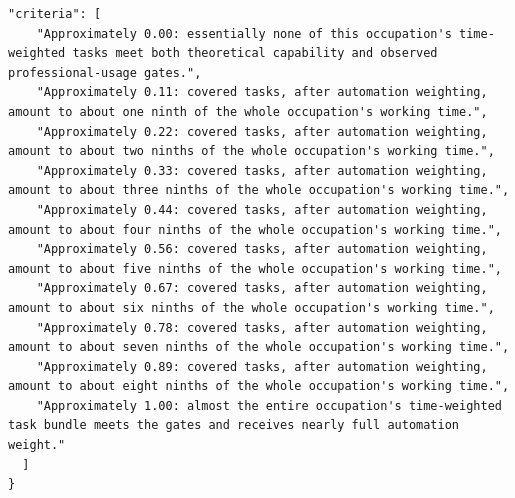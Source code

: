{\begin{Verbatim}[breaklines=true,breakanywhere=true,fontsize=\footnotesize]
  "criteria": [
    "Approximately 0.00: essentially none of this occupation's time-weighted tasks meet both theoretical capability and observed professional-usage gates.",
    "Approximately 0.11: covered tasks, after automation weighting, amount to about one ninth of the whole occupation's working time.",
    "Approximately 0.22: covered tasks, after automation weighting, amount to about two ninths of the whole occupation's working time.",
    "Approximately 0.33: covered tasks, after automation weighting, amount to about three ninths of the whole occupation's working time.",
    "Approximately 0.44: covered tasks, after automation weighting, amount to about four ninths of the whole occupation's working time.",
    "Approximately 0.56: covered tasks, after automation weighting, amount to about five ninths of the whole occupation's working time.",
    "Approximately 0.67: covered tasks, after automation weighting, amount to about six ninths of the whole occupation's working time.",
    "Approximately 0.78: covered tasks, after automation weighting, amount to about seven ninths of the whole occupation's working time.",
    "Approximately 0.89: covered tasks, after automation weighting, amount to about eight ninths of the whole occupation's working time.",
    "Approximately 1.00: almost the entire occupation's time-weighted task bundle meets the gates and receives nearly full automation weight."
  ]
}
\end{Verbatim}
}
